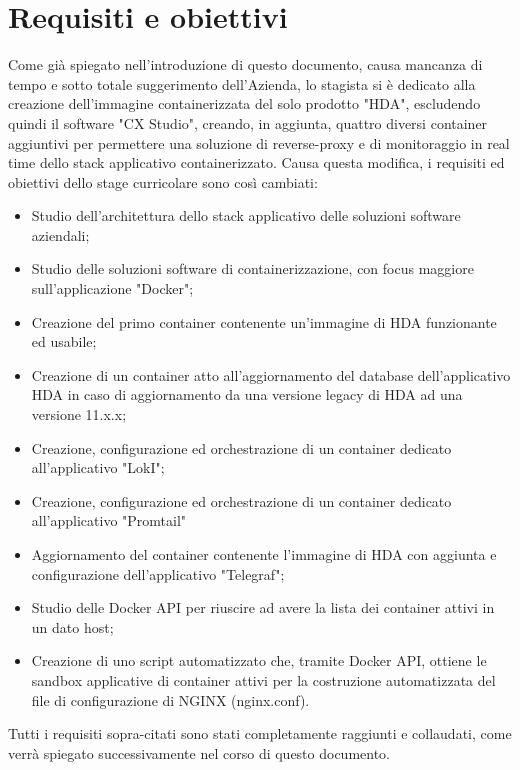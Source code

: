 \section{Requisiti e obiettivi}
Come già spiegato nell'introduzione di questo documento, causa mancanza di tempo e sotto totale suggerimento dell'Azienda, lo stagista si è dedicato alla creazione dell'immagine containerizzata del solo prodotto "HDA", escludendo quindi il software "CX Studio", creando, in aggiunta, quattro diversi container aggiuntivi per permettere una soluzione di reverse-proxy e di monitoraggio in real time dello stack applicativo containerizzato.
Causa questa modifica, i requisiti ed obiettivi dello stage curricolare sono così cambiati:
\begin{itemize}
	\item Studio dell'architettura dello stack applicativo delle soluzioni software aziendali;
	\item Studio delle soluzioni software di containerizzazione, con focus maggiore sull'applicazione "Docker";
	\item Creazione del primo container contenente un'immagine di HDA funzionante ed usabile;
	\item Creazione di un container atto all'aggiornamento del database dell'applicativo HDA in caso di aggiornamento da una versione legacy di HDA ad una versione 11.x.x;
	\item Creazione, configurazione ed orchestrazione di un container dedicato all'applicativo "LokI";
	\item Creazione, configurazione ed orchestrazione di un container dedicato all'applicativo "Promtail"
	\item Aggiornamento del container contenente l'immagine di HDA con aggiunta e configurazione dell'applicativo "Telegraf";
	\item Studio delle Docker API per riuscire ad avere la lista dei container attivi in un dato host;
	\item Creazione di uno script automatizzato che, tramite Docker API, ottiene le sandbox applicative di container attivi per la costruzione automatizzata del file di configurazione di NGINX (nginx.conf).
\end{itemize}

Tutti i requisiti sopra-citati sono stati completamente raggiunti e collaudati, come verrà spiegato successivamente nel corso di questo documento.


